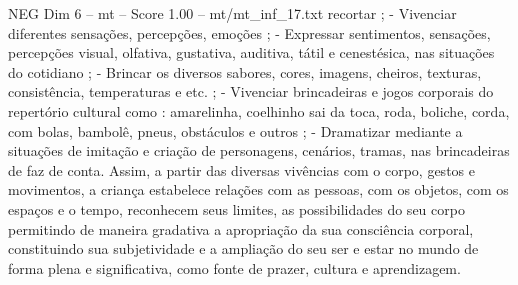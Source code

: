\begin{textsample}{NEG Dim 6 – mt – Score 1.00 – mt/mt\_inf\_17.txt}
recortar ; - Vivenciar diferentes sensações, percepções, emoções ; - Expressar sentimentos, sensações, percepções visual, olfativa, gustativa, auditiva, tátil e cenestésica, nas situações do cotidiano ; - Brincar os diversos sabores, cores, imagens, cheiros, texturas, consistência, temperaturas e etc. ; - Vivenciar brincadeiras e jogos corporais do repertório cultural como : amarelinha, coelhinho sai da toca, roda, boliche, corda, com bolas, bambolê, pneus, obstáculos e outros ; - Dramatizar mediante a situações de imitação e criação de personagens, cenários, tramas, nas brincadeiras de faz de conta.
Assim, a partir das diversas vivências com o corpo, gestos e movimentos, a criança estabelece relações com as pessoas, com os objetos, com os espaços e o tempo, reconhecem seus limites, as possibilidades do seu corpo permitindo de maneira gradativa a apropriação da sua consciência corporal, constituindo sua subjetividade e a ampliação do seu ser e estar no mundo de forma plena e significativa, como fonte de prazer, cultura e aprendizagem.

\end{textsample}
